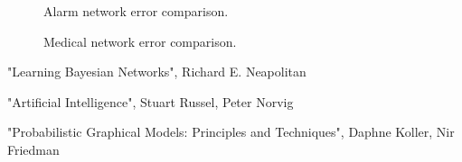\documentclass[11pt]{article}
\begin{document}
	\begin{figure}[H]
		\caption{Alarm network error comparison.}
		\label{fig:error_alarm}
	\end{figure}
	\begin{figure}[H]
		\caption{Medical network error comparison.}
	\label{fig:error_medical}
\end{figure}
\newpage
	\begin{thebibliography}{9}
		"Learning Bayesian Networks", Richard E. Neapolitan
		
		"Artificial Intelligence", Stuart Russel, Peter Norvig
		
		"Probabilistic Graphical Models: Principles and Techniques", Daphne Koller, Nir Friedman
		
	\end{thebibliography}
\end{document}
